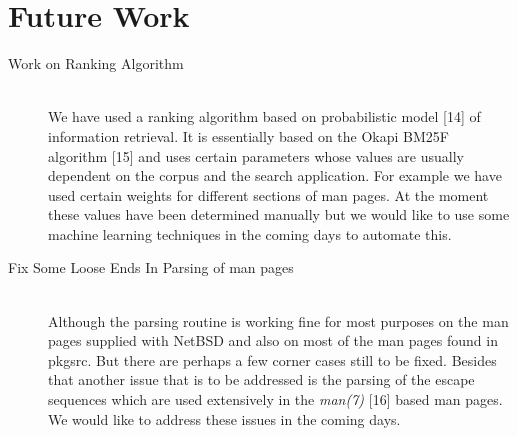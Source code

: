 \documentclass[titlepage, a4paper, 12pt]{article}
\begin{document}
\section{Future Work}
\begin{description}
\item[Work on Ranking Algorithm] \hfill \\
We have used a ranking algorithm based on probabilistic model [14] of information
retrieval. It is essentially based on the Okapi BM25F algorithm [15] and uses
certain parameters whose values are usually dependent on the corpus and the
search application. For example we have used certain weights for different
sections of man pages. At the moment these values have been determined manually
but we would like to use some machine learning techniques in the coming days to
automate this.
\end{description}
\begin{description}
\item[Fix Some Loose Ends In Parsing of man pages] \hfill \\
Although the parsing routine is working fine for most purposes on the man pages
supplied with NetBSD and also on most of the man pages found in pkgsrc. But there
are perhaps a few corner cases still to be fixed. Besides that another issue that
is to be addressed is the parsing of the escape sequences which are used
extensively in the \textit{man(7)} [16] based man pages. We would like to address
these issues in the coming days.
\end{description}
\end{document}
